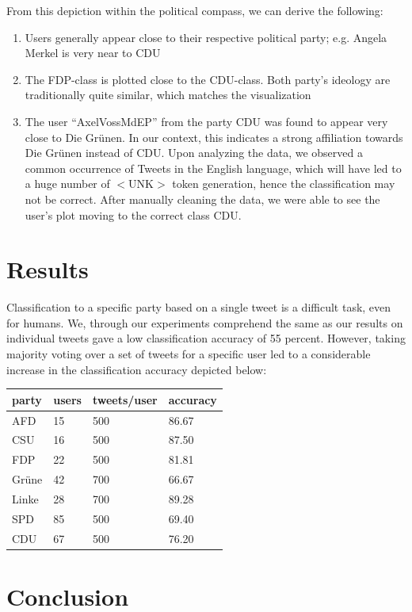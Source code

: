 \documentclass[10pt, oneside]{article}
\begin{document}
\begin{multicols}{2}
From this depiction within the political compass, we can derive the following:

\begin{enumerate}
	\item Users generally appear close to their respective political party; e.g. Angela Merkel is very near to CDU
	\item The FDP-class is plotted close to the CDU-class. Both party's ideology are traditionally quite similar, which matches the visualization
	\item The user ``AxelVossMdEP'' from the party CDU was found to appear very close to Die Grünen. In our context, this indicates a strong affiliation towards Die Grünen instead of CDU. Upon analyzing the data, we observed a common occurrence  of Tweets in the English language, which will have led to a huge number of $<$UNK$>$ token generation, hence the classification may not be correct. After manually cleaning the data, we were able to see the user's plot moving to the correct class CDU.
\end{enumerate}

\section{Results}
Classification to a specific party based on a single tweet is a difficult task, even for humans. We, through our experiments comprehend the same as our results on individual tweets gave a low classification accuracy of 55 percent.
However, taking majority voting over a set of tweets for a specific user led to a considerable increase in the classification accuracy depicted below:
\begin{center}
	\begin{tabular}{|l|l|l|l|}
	\hline
	\textbf{party} & \textbf{users} & \textbf{tweets/user} & \textbf{accuracy} \\ \hline
	AFD & 15 & 500 & 86.67 \\
	CSU & 16 & 500 & 87.50 \\
	FDP & 22 & 500 & 81.81 \\
	Grüne & 42 & 700 & 66.67 \\
	Linke & 28 & 700 & 89.28 \\
	SPD & 85 & 500 & 69.40 \\
	CDU & 67 & 500 & 76.20 \\
	\hline
	\end{tabular}
\end{center}


\section{Conclusion}


\end{multicols}
\end{document}
